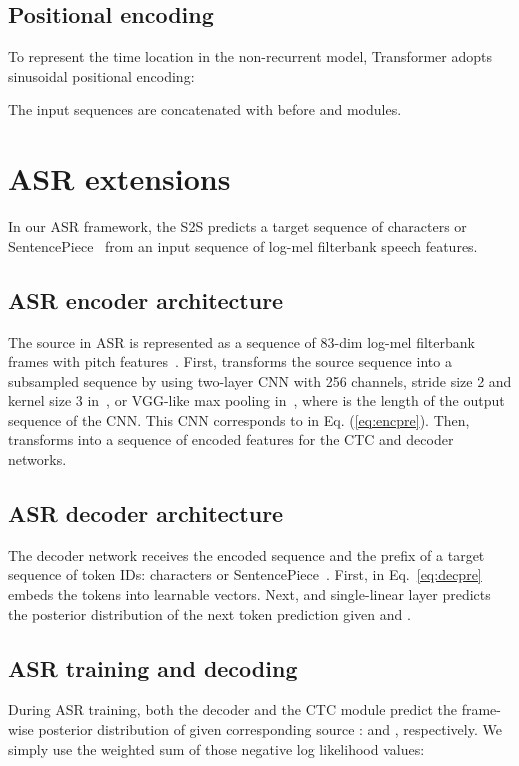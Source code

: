 \subsection{Positional encoding}

To represent the time location in the non-recurrent model, Transformer adopts sinusoidal positional encoding:

The input sequences  are concatenated with   before  and   modules. 


\section{ASR extensions}

In our ASR framework, the S2S predicts a target sequence  of characters or SentencePiece~\cite{kudo-richardson-2018-sentencepiece} from an input sequence  of log-mel filterbank speech features. 

\subsection{ASR encoder architecture}

The source  in ASR is represented as a sequence of 83-dim log-mel filterbank frames with pitch features~\cite{kaldi-pitch}.
First,  transforms the source sequence  into a subsampled sequence  by using two-layer CNN with 256 channels, stride size 2 and kernel size 3 in~\cite{speech-transformer}, or VGG-like max pooling in~\cite{HoriWZC17}, where  is the length of the output sequence of the CNN. This CNN corresponds to  in Eq. (\ref{eq:encpre}). Then,   transforms  into a sequence of encoded features  for the CTC and decoder networks.

\subsection{ASR decoder architecture}

The decoder network receives the encoded sequence  and the prefix of a target sequence  of  token IDs: characters or SentencePiece~\cite{kudo-richardson-2018-sentencepiece}. 
First,  in Eq.~\eqref{eq:decpre} embeds the tokens into learnable vectors. Next,  and single-linear layer  predicts the posterior distribution of the next token prediction  given  and .




\subsection{ASR training and decoding}
\label{sec:asr_train_decode}
During ASR training, both the decoder and the CTC module predict the frame-wise posterior distribution of  given corresponding source :  and ,  respectively. We simply use the weighted sum of those negative log likelihood values:

